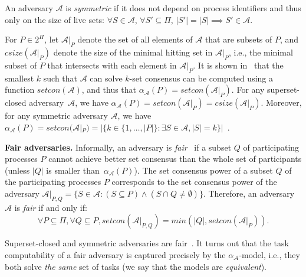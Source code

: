 \documentclass[a4paper]{article}
\newtheorem{theorem}{Theorem}
\newtheorem{definition}{Definition}
\newcommand{\myparagraph}[1]{\vspace{6pt}\noindent \textbf{#1}}
\def\A{\ensuremath{\mathcal{A}}}
\def\fair{\textit{fair}}
\def\Fair{\textit{Fair}}
\def\HSS{\mathit{csize}}
\newcommand{\setcon}{\mathit{setcon}}
\begin{document}
%


An adversary $\A$ is \emph{symmetric} if it does not depend on process
identifiers and thus only on the size of live sets: 
$\forall S \in \A$, $\forall S' \subseteq \Pi$, $|S'|=|S|\implies S'\in\A$.

%
For  $P\in 2^{\Pi}$, let $\A|_P$ denote the set of all elements of
$\A$ that are subsets of $P$, and $\HSS(\A|_P)$ denote the size of the
minimal hitting set in $\A|_P$, i.e., the minimal subset of $P$ that
intersects with each element in $\A|_P$.  
It is shown in~\cite{GK10} that the smallest $k$ such that $\A$ 
can solve $k$-set consensus can be computed using a function $\setcon(\A)$,
and thus that $\alpha_{\A}(P)=\setcon(\A|_P)$.
For any superset-closed adversary~$\A$, we have
$\alpha_{\A}(P) = \setcon(\A|_P) = \HSS(\A|_P)$.
Moreover, for any symmetric adversary $\A$, we have
$\alpha_{\A}(P)= \setcon(\A|_P) = |\{k\in\{1,\ldots,|P|\}: \exists S \in \A, |S|=k\}|$~\cite{GK10}.

\myparagraph{Fair adversaries.}
%
Informally, an adversary is \emph{{\fair}}~\cite{KR17} if a subset $Q$ of
participating processes $P$ cannot achieve better set consensus than the
whole set of participants (unless $|Q|$ is smaller than~$\alpha_{\A}(P)$).
The set consensus power of a subset $Q$ of the participating processes $P$
corresponds to the set consensus power of the adversary 
$\A|_{P,Q} = \{S\in\A:(S\subseteq P)\wedge(S\cap Q\neq\emptyset)\}.$
Therefore, an adversary $\A$ is {\fair} if and only if:
\[\forall P \subseteq \Pi, \forall Q\subseteq P, \setcon(\A|_{P,Q})= min(|Q|,\setcon(\A|_P)){}.\]

Superset-closed and symmetric adversaries are fair~\cite{KR17}.
%
It turns out that the task computability of a fair adversary is
captured precisely by the $\alpha_\A$-model, i.e.,
they both solve \emph{the same} set of tasks
(we say that the models are \emph{equivalent}).
\end{document}
